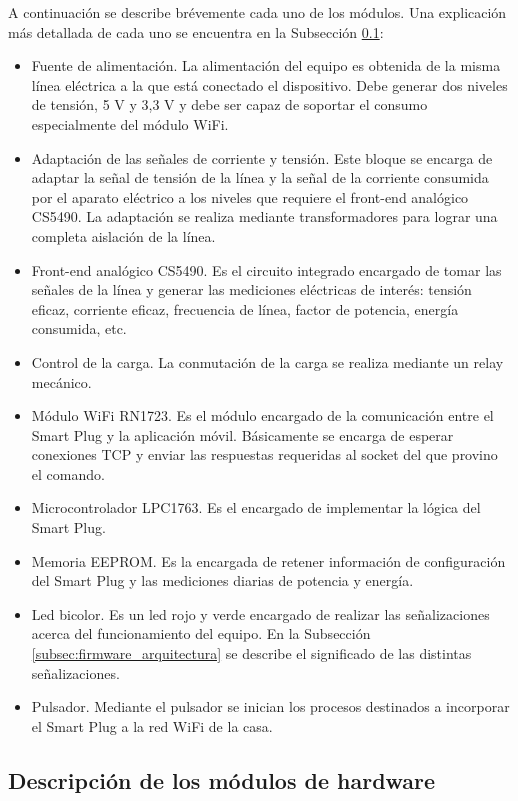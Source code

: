 A continuación se describe brévemente cada uno de los módulos. Una explicación más detallada de cada uno se encuentra en la Subsección \ref{subsec:detalles_hardware}:

\begin{itemize}
\item Fuente de alimentación. La alimentación del equipo es obtenida de la misma línea eléctrica a la que está conectado el dispositivo. Debe generar dos niveles de tensión, 5 V y 3,3 V y debe ser capaz de soportar el consumo especialmente del módulo WiFi.
\item Adaptación de las señales de corriente y tensión. Este bloque se encarga de adaptar la señal de tensión de la línea y la señal de la corriente consumida por el aparato eléctrico a los niveles que requiere el front-end analógico CS5490. La adaptación se realiza mediante transformadores para lograr una completa aislación de la línea.
\item Front-end analógico CS5490. Es el circuito integrado encargado de tomar las señales de la línea y generar las mediciones eléctricas de interés: tensión eficaz, corriente eficaz, frecuencia de línea, factor de potencia, energía consumida, etc.
\item Control de la carga. La conmutación de la carga se realiza mediante un relay mecánico.
\item Módulo WiFi RN1723. Es el módulo encargado de la comunicación entre el Smart Plug y la aplicación móvil. Básicamente se encarga de esperar conexiones TCP y enviar las respuestas requeridas al socket del que provino el comando.
\item Microcontrolador LPC1763. Es el encargado de implementar la lógica del Smart Plug. 
\item Memoria EEPROM. Es la encargada de retener información de configuración del Smart Plug y las mediciones diarias de potencia y energía.
\item Led bicolor. Es un led rojo y verde encargado de realizar las señalizaciones acerca del funcionamiento del equipo. En la Subsección \ref{subsec:firmware_arquitectura} se describe el significado de las distintas señalizaciones.
\item Pulsador. Mediante el pulsador se inician los procesos destinados a incorporar el Smart Plug a la red WiFi de la casa.
\end{itemize}

\subsection{Descripción de los módulos de hardware}
\label{subsec:detalles_hardware}

